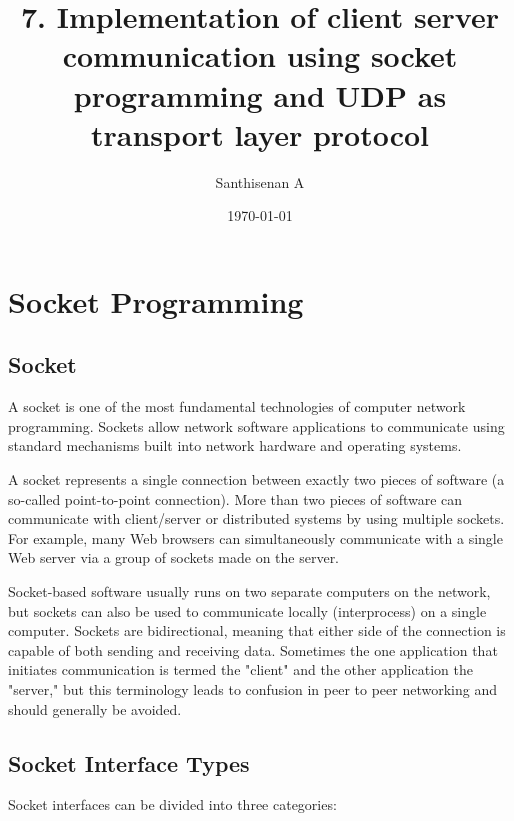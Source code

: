 \documentclass[a4paper,12pt]{article}
\begin{document}
    
    
\title{7. Implementation of client server communication using socket programming and UDP as transport layer protocol}
\author{Santhisenan A}
\date{\today}
\maketitle
    
\section{Socket Programming}
    
\subsection{Socket}
A socket is one of the most fundamental technologies of computer network programming. Sockets allow network software applications to communicate using standard mechanisms built into network hardware and operating systems.
    
    
A socket represents a single connection between exactly two pieces of software (a so-called point-to-point connection). More than two pieces of software can communicate with client/server or distributed systems by using multiple sockets. For example, many Web browsers can simultaneously communicate with a single Web server via a group of sockets made on the server.
    
    
Socket-based software usually runs on two separate computers on the network, but sockets can also be used to communicate locally (interprocess) on a single computer. Sockets are bidirectional, meaning that either side of the connection is capable of both sending and receiving data. Sometimes the one application that initiates communication is termed the "client" and the other application the "server," but this terminology leads to confusion in peer to peer networking and should generally be avoided.
    
\subsection{Socket Interface Types}
    
Socket interfaces can be divided into three categories:
    
\end{document}
